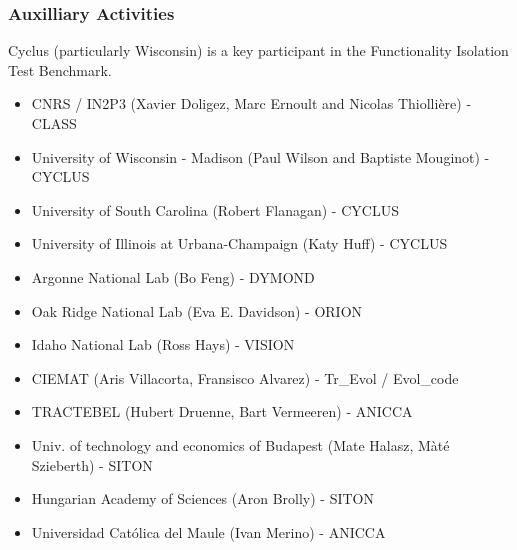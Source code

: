 \begin{frame}
        \frametitle{Auxilliary Activities}


        Cyclus (particularly Wisconsin) is a key participant in the 
        Functionality Isolation Test Benchmark.
        \begin{itemize}
             \item CNRS / IN2P3 (Xavier Doligez, Marc Ernoult and Nicolas Thiollière) - CLASS
             \item University of Wisconsin - Madison (Paul Wilson and Baptiste Mouginot) - CYCLUS
             \item University of South Carolina (Robert Flanagan) - CYCLUS
             \item University of Illinois at Urbana-Champaign (Katy Huff) - CYCLUS
             \item Argonne National Lab (Bo Feng) - DYMOND
             \item Oak Ridge National Lab (Eva E. Davidson) - ORION
             \item Idaho National Lab (Ross Hays) - VISION
             \item CIEMAT (Aris Villacorta, Fransisco Alvarez) - Tr\_Evol / 
                     Evol\_code
             \item TRACTEBEL (Hubert Druenne, Bart Vermeeren) - ANICCA
             \item Univ. of technology and economics of Budapest (Mate Halasz, Màté Szieberth) - SITON
             \item Hungarian Academy of Sciences (Aron Brolly) - SITON
             \item Universidad Católica del Maule (Ivan Merino) - ANICCA
        \end{itemize}
\end{frame}

